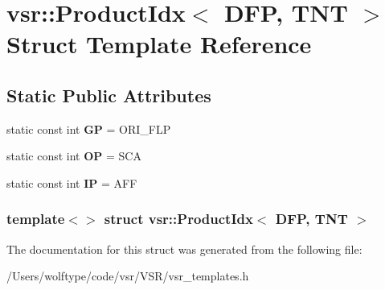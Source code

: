 \hypertarget{structvsr_1_1_product_idx_3_01_d_f_p_00_01_t_n_t_01_4}{\section{vsr\-:\-:Product\-Idx$<$ D\-F\-P, T\-N\-T $>$ Struct Template Reference}
\label{structvsr_1_1_product_idx_3_01_d_f_p_00_01_t_n_t_01_4}
}
\subsection*{Static Public Attributes}
\begin{DoxyCompactItemize}
\item 
\hypertarget{structvsr_1_1_product_idx_3_01_d_f_p_00_01_t_n_t_01_4_a88600da018b44074a4e5470942683825}{static const int {\bfseries G\-P} = O\-R\-I\-\_\-\-F\-L\-P}\label{structvsr_1_1_product_idx_3_01_d_f_p_00_01_t_n_t_01_4_a88600da018b44074a4e5470942683825}

\item 
\hypertarget{structvsr_1_1_product_idx_3_01_d_f_p_00_01_t_n_t_01_4_af96adffd40c57a48aca8e1507d35ab9a}{static const int {\bfseries O\-P} = S\-C\-A}\label{structvsr_1_1_product_idx_3_01_d_f_p_00_01_t_n_t_01_4_af96adffd40c57a48aca8e1507d35ab9a}

\item 
\hypertarget{structvsr_1_1_product_idx_3_01_d_f_p_00_01_t_n_t_01_4_a26a127b2f41bd77a71c21e50107dfdda}{static const int {\bfseries I\-P} = A\-F\-F}\label{structvsr_1_1_product_idx_3_01_d_f_p_00_01_t_n_t_01_4_a26a127b2f41bd77a71c21e50107dfdda}

\end{DoxyCompactItemize}
\subsubsection*{template$<$$>$ struct vsr\-::\-Product\-Idx$<$ D\-F\-P, T\-N\-T $>$}



The documentation for this struct was generated from the following file\-:\begin{DoxyCompactItemize}
\item 
/\-Users/wolftype/code/vsr/\-V\-S\-R/vsr\-\_\-templates.\-h\end{DoxyCompactItemize}
